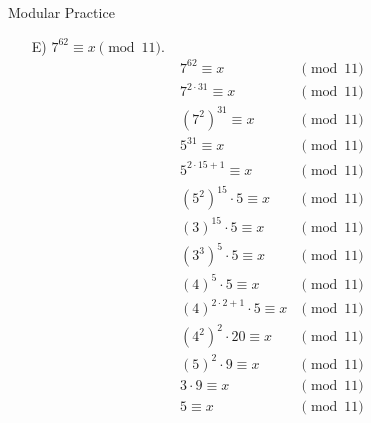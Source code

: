 \begin{homeworkProblem}{Modular Practice}
\begin{itemize}
        \item[E)] $7^{62} \equiv x \pmod{11}$.
        \[
            \begin{split}
                7^{62} \equiv x & \pmod{11} \\
                7^{2 \cdot 31} \equiv x & \pmod{11} \\ 
                (7^2)^{31} \equiv x & \pmod{11} \\
                5^{31} \equiv x & \pmod{11} \\
                5^{2 \cdot 15 + 1} \equiv x & \pmod{11} \\
                (5^2)^{15} \cdot 5 \equiv x & \pmod{11} \\
                (3)^{15} \cdot 5 \equiv x & \pmod{11} \\
                (3^3)^5 \cdot 5 \equiv x & \pmod{11} \\
                (4)^5 \cdot 5 \equiv x & \pmod{11} \\
                (4)^{2 \cdot 2 + 1} \cdot 5 \equiv x & \pmod{11} \\
                (4^2)^{2} \cdot 20 \equiv x & \pmod{11} \\
                (5)^{2} \cdot 9 \equiv x & \pmod{11} \\
                3 \cdot 9 \equiv x & \pmod{11} \\
                5 \equiv x & \pmod{11}
            \end{split}
        \]
    \end{itemize}
    


\end{homeworkProblem}